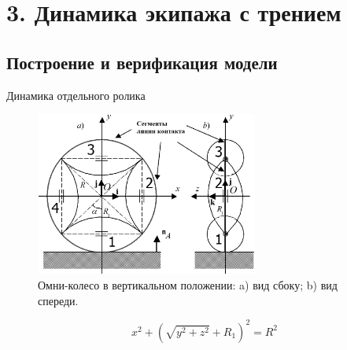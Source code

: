 \documentclass{beamer}
\begin{document}
\section{3. Динамика экипажа с трением}

\subsection{Построение и верификация модели}

\begin{frame}{Динамика отдельного ролика}
    \begin{figure}[htb]
        \centering\includegraphics[width=0.65\textwidth]{content/parts/3_friction/nd/OmniWheel.eps}
        \caption{Омни-колесо в вертикальном положении: a) вид сбоку; b) вид спереди.}
    \end{figure}
    $$ x^2+\left(\sqrt{y^2+z^2}+R_1\right)^2=R^2 $$
\end{frame}
\end{document}

